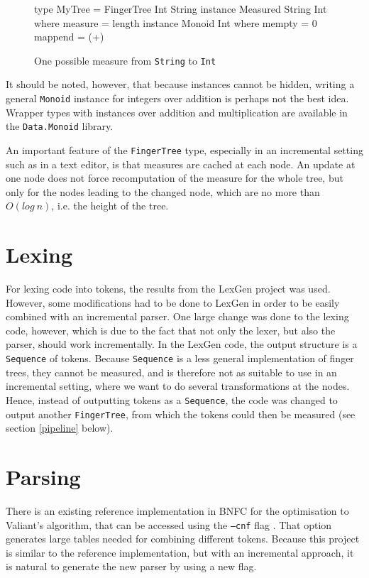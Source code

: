 \documentclass[a4paper,12pt,twosided]{report}
\renewcommand\cite{\citep}
\begin{document}
\begin{figure}[H]
\begin{code}
type MyTree = FingerTree Int String
instance Measured String Int where
    measure = length
instance Monoid Int where
    mempty = 0
    mappend = (+)
\end{code}
\caption{One possible measure from \texttt{String} to \texttt{Int}}
\end{figure}
It should be noted, however, that because instances cannot be hidden, writing a
general \texttt{Monoid} instance for integers over addition is perhaps not the
best idea. Wrapper types with instances over addition and multiplication are
available in the \texttt{Data.Monoid} library. 

An important feature of the \texttt{FingerTree} type, especially in an incremental
setting such as in a text editor, is that measures are cached at each node. An
update at one node does not force recomputation of the measure for the whole
tree, but only for the nodes leading to the changed node, which are no more than
$O(log\ n)$, i.e. the height of the tree. 

\section{Lexing}
For lexing code into tokens, the results from the LexGen project was used.
However, some modifications had to be done to LexGen in order to be easily
combined with an incremental parser. One large change was done to the lexing
code, however, which is due to the fact that not only the lexer, but also the
parser, should work incrementally. In the LexGen code, the output structure is a
\texttt{Sequence} of tokens. Because \texttt{Sequence} is a less general
implementation of finger trees, they cannot be measured, and is therefore not as
suitable to use in an incremental setting, where we want to do several
transformations at the nodes. Hence, instead of outputting tokens
as a \texttt{Sequence}, the code was changed to output another
\texttt{FingerTree}, from which the tokens could then be measured (see section
\ref{pipeline} below).

\section{Parsing}
There is an existing reference implementation in BNFC for the optimisation to
Valiant's algorithm, that can be accessed using the \texttt{---cnf} flag
\cite{parparsepaper}. That option generates large tables needed for combining
different tokens. Because this project is similar to the reference
implementation, but with an incremental approach, it is natural to generate the
new parser by using a new flag.
\end{document}
